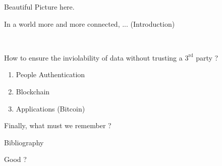 \documentclass[12pt]{beamer}
\begin{document}
\begin{frame}
Beautiful Picture here. %
\end{frame}

\begin{frame}
In a world more and more connected, ... (Introduction) %

\

How to ensure the inviolability of data without trusting a $3^{\mathrm {rd}}$ party ?

\end{frame}

\begin{frame}

\begin{enumerate} %
\item People Authentication 
\item Blockchain
\item Applications (Bitcoin)
\end{enumerate}

\end{frame}


\begin{frame}
Finally, what must we remember ? %
\end{frame}

\begin{frame}
Bibliography %
\end{frame}

\begin{frame}


Good ?

\end{frame}
\end{document}
